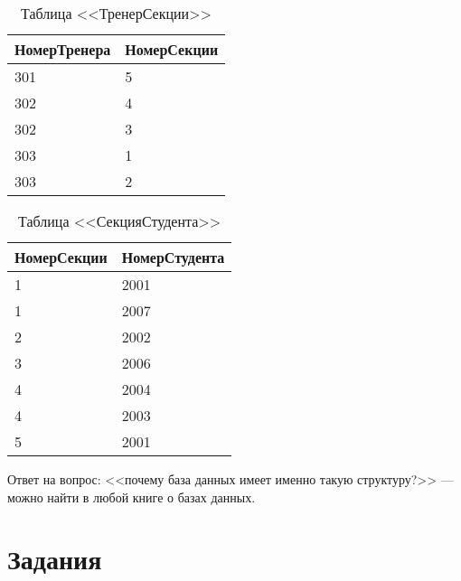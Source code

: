 \begin{table}
    \centering
    \begin{tabular}{|l|l|}
        \hline\hline
        НомерТренера    & НомерСекции \\
        \hline\hline
        301             & 5\\
        302             & 4\\
        302             & 3\\
        303             & 1\\
        303             & 2\\
        \hline
    \end{tabular}
    \caption{Таблица <<ТренерСекции>>}
    \label{tbl:ralg:SectionTrainer}
\end{table}

\begin{table}
    \centering
    \begin{tabular}{|l|l|}
        \hline\hline
        НомерСекции     & НомерСтудента \\
        \hline\hline
        1               & 2001\\
        1               & 2007\\
        2               & 2002\\
        3               & 2006\\
        4               & 2004\\
        4               & 2003\\
        5               & 2001\\
        \hline
    \end{tabular}
    \caption{Таблица <<СекцияСтудента>>}
    \label{tbl:ralg:StudentSection}
\end{table}    

Ответ на вопрос: <<почему база данных имеет именно такую структуру?>> --- можно найти в любой книге о базах данных.


\section*{Задания}


